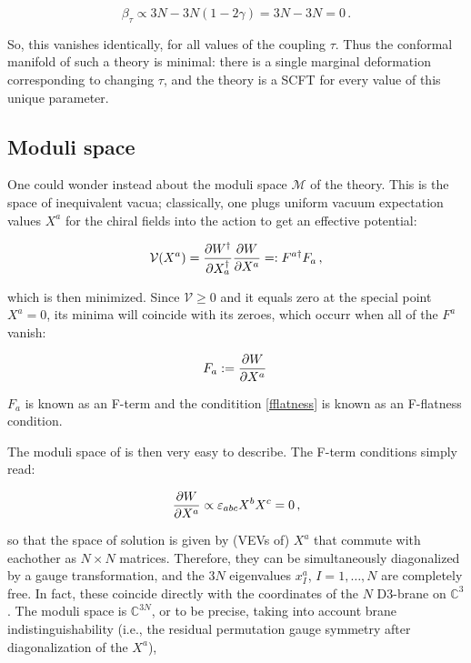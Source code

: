 \begin{equation}
	\beta_\tau \propto 3 N - 3 N (1-2\gamma) = 3N-3N = 0\,.
\end{equation}

So, this vanishes identically, for all values of the coupling $\tau$. Thus the conformal manifold of such a theory is minimal: there is a single marginal deformation corresponding to changing $\tau$, and the theory is a SCFT for every value of this unique parameter.

\subsection{Moduli space}

One could wonder instead about the moduli space $\mathcal{M}$ of the theory. This is the space of inequivalent vacua; classically, one plugs uniform vacuum expectation values $X^a$ for the chiral fields into the action to get an effective potential:

\begin{equation}
	\mathcal{V}(X^a) = \frac{\partial W^\dagger}{\partial X^\dagger_a} \frac{\partial W}{\partial X^a} =: F^{a\dagger} F_a\,,
	\label{}
\end{equation}

which is then minimized. Since $\mathcal{V} \geq 0$ and it equals zero at the special point $X^a = 0$, its minima will coincide with its zeroes, which occurr when all of the $F^a$ vanish:

\begin{equation}
	F_a := \frac{\partial W}{\partial X^a}\,
	\label{fflatness}
\end{equation}

$F_a$ is known as an F-term and the conditition \eqref{fflatness} is known as an F-flatness condition.

The moduli space of \SYM is then very easy to describe. The F-term conditions simply read:

\begin{equation}
	\frac{\partial W}{\partial X^a} \propto \varepsilon_{abc} X^b X^c = 0\,,
	\label{}
\end{equation}

so that the space of solution is given by (VEVs of) $X^a$ that commute with eachother as $N\times N$ matrices. Therefore, they can be simultaneously diagonalized by a gauge transformation, and the $3N$ eigenvalues $x^a_I$, $I=1,\ldots,N$ are completely free. In fact, these coincide directly with the coordinates of the $N$ D3-brane on $\mathbb{C}^3$. The moduli space is $\mathbb{C}^{3N}$, or to be precise, taking into account brane indistinguishability (i.e., the residual permutation gauge symmetry after diagonalization of the $X^a$),

